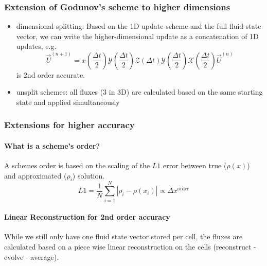 \subsubsection*{Extension of Godunov's scheme to higher dimensions}
\begin{itemize}
    \item dimensional splitting: Based on the 1D update scheme and the full fluid state
    vector, we can write the higher-dimensional update as a concatenation of 1D updates,
    e.g. \begin{equation}
        \vec{U}^{(n+1)}=x\left(\frac{\Delta t}{2}\right) \mathcal{Y}\left(\frac{\Delta t}{2}\right) \mathcal{Z}(\Delta t) \mathcal{Y}\left(\frac{\Delta t}{2}\right) \mathcal{X}\left(\frac{\Delta t}{2}\right) \vec{U}^{(n)}
    \end{equation}
    is 2nd order accurate.
    \item unsplit schemes: all fluxes ($3$ in $3$D) are calculated based on the same starting state
    and applied simultaneously
\end{itemize}

\subsubsection*{Extensions for higher accuracy}
\paragraph*{What is a scheme's order?} A schemes order is based on the scaling of 
the $L1$ error between true ($\rho(x)$) and approximated ($\rho_i$) solution.
\begin{equation}
    L1 = \frac{1}{N} \sum_{i=1}^{N}{\left| \rho_i - \rho(x_i) \right|} \propto \Delta x^\text{order}
\end{equation}

\paragraph*{Linear Reconstruction for 2nd order accuracy} While
we still only have one fluid state vector stored per cell, the fluxes 
are calculated based on a piece wise linear reconstruction on the cells
(reconstruct - evolve - average).

